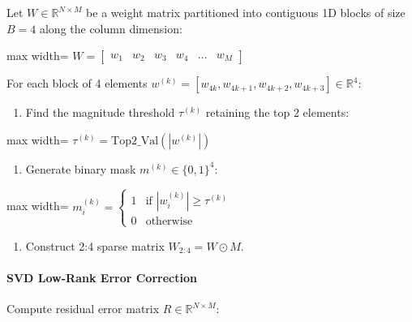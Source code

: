 Let $W \in \mathbb{R}^{N \times M}$ be a weight matrix partitioned into contiguous 1D blocks of size $B = 4$ along the column dimension:

\begin{center}
\begin{adjustbox}{max width=\columnwidth}
$\displaystyle
W = \begin{bmatrix} w_1 & w_2 & w_3 & w_4 & \dots & w_M \end{bmatrix}
$
\end{adjustbox}
\end{center}

For each block of 4 elements $w^{(k)} = [w_{4k}, w_{4k+1}, w_{4k+2}, w_{4k+3}] \in \mathbb{R}^4$:

\begin{enumerate}
\item Find the magnitude threshold $\tau^{(k)}$ retaining the top 2 elements:
\end{enumerate}
\begin{center}
\begin{adjustbox}{max width=\columnwidth}
$\displaystyle
\tau^{(k)} = \text{Top2\_Val}\left( |w^{(k)}| \right)
$
\end{adjustbox}
\end{center}
\begin{enumerate}
\item Generate binary mask $m^{(k)} \in \{0, 1\}^4$:
\end{enumerate}
\begin{center}
\begin{adjustbox}{max width=\columnwidth}
$\displaystyle
m_i^{(k)} = \begin{cases} 1 & \text{if } |w_i^{(k)}| \ge \tau^{(k)} \\ 0 & \text{otherwise} \end{cases}
$
\end{adjustbox}
\end{center}
\begin{enumerate}
\item Construct 2:4 sparse matrix $W_{2:4} = W \odot M$.

\end{enumerate}
\paragraph{SVD Low-Rank Error Correction}

Compute residual error matrix $R \in \mathbb{R}^{N \times M}$:

